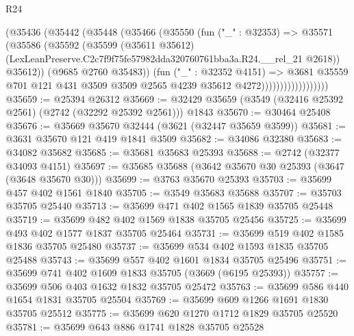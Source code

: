 \begin{lexlean}{R24}
\begin{coremodule}
                            (@35436
                              (@35442
                                (@35448
                                  (@35466
                                    (@35550
                                      (fun ("_" : @32353) =>
                                      @35571
                                        (@35586
                                          (@35592
                                            (@35599
                                              (@35611 @35612)
                                              (LexLeanPreserve.C2c7f9f75fe57982dda320760761bba3a.R24.__rel_21
                                                @2618))
                                            @35612))
                                        (@9685 @2760 @35483))
                                      (fun ("_" : @32352 @4151) =>
                                      @3681
                                        @35559
                                        @701
                                        @121
                                        @431
                                        @3509
                                        @3509
                                        @2565
                                        @4239
                                        @35612
                                        @4272))))))))))))))))))
@35659 := @25394 @26312
@35669 := @32429 @35659 (@3549 (@32416 @25392 @2561) (@2742 (@32292 @25392 @2561))) @1843
@35670 := @30464 @25408
@35676 := @35669 @35670 @32444 (@3621 (@32447 @35659 @3599))
@35681 := @3631 @35670 @121 @419 @1841 @3509
@35682 := @34086 @32380
@35683 := @34082 @35682
@35685 := @35681 @35683 @25393
@35688 := @2742 (@32377 @34093 @4151)
@35697 := @35685 @35688 (@3642 @35670 @30 @25393 (@3647 (@3648 @35670 @30)))
@35699 := @3763 @35670 @25393
@35703 := @35699 @457 @402 @1561 @1840
@35705 := @3549 @35683 @35688
@35707 := @35703 @35705 @25440
@35713 := @35699 @471 @402 @1565 @1839 @35705 @25448
@35719 := @35699 @482 @402 @1569 @1838 @35705 @25456
@35725 := @35699 @493 @402 @1577 @1837 @35705 @25464
@35731 := @35699 @519 @402 @1585 @1836 @35705 @25480
@35737 := @35699 @534 @402 @1593 @1835 @35705 @25488
@35743 := @35699 @557 @402 @1601 @1834 @35705 @25496
@35751 := @35699 @741 @402 @1609 @1833 @35705 (@3669 (@6195 @25393))
@35757 := @35699 @506 @403 @1632 @1832 @35705 @25472
@35763 := @35699 @586 @440 @1654 @1831 @35705 @25504
@35769 := @35699 @609 @1266 @1691 @1830 @35705 @25512
@35775 := @35699 @620 @1270 @1712 @1829 @35705 @25520
@35781 := @35699 @643 @886 @1741 @1828 @35705 @25528

\end{coremodule}
\end{lexlean}
